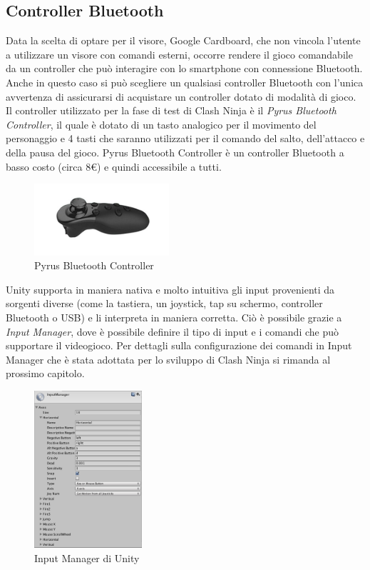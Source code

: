 \documentclass[12pt,a4paper,openright,twoside]{book}
\begin{document}
	\subsection{Controller Bluetooth}
	Data la scelta di optare per il visore, Google Cardboard, che non vincola l'utente a utilizzare un visore con comandi esterni, occorre rendere il gioco comandabile da un controller che può interagire con lo smartphone con connessione Bluetooth.\\
	Anche in questo caso si può scegliere un qualsiasi controller Bluetooth con l'unica avvertenza di assicurarsi di acquistare un controller dotato di modalità di gioco.\\
	Il controller utilizzato per la fase di test di Clash Ninja è il \textit{Pyrus Bluetooth Controller}, il quale è dotato di un tasto analogico per il movimento del personaggio e 4 tasti che saranno utilizzati per il comando del salto, dell'attacco e della pausa del gioco. Pyrus Bluetooth Controller è un controller Bluetooth a basso costo (circa 8\euro) e quindi accessibile a tutti.\\
	\begin{figure}[h]
		\centering
		\includegraphics[width=50mm]{pyruscontroller.jpg}
		\caption{Pyrus Bluetooth Controller}
		\label{fig:pyruscontroller}
	\end{figure}
	Unity supporta in maniera nativa e molto intuitiva gli input provenienti da sorgenti diverse (come la tastiera, un joystick, tap su schermo, controller Bluetooth o USB) e li interpreta in maniera corretta. Ciò è possibile grazie a \textit{Input Manager}, dove è possibile definire il tipo di input e i comandi che può supportare il videogioco. Per dettagli sulla configurazione dei comandi in Input Manager che è stata adottata per lo sviluppo di Clash Ninja si rimanda al prossimo capitolo.
	\begin{figure}[h]
		\centering
		\includegraphics[width=40mm]{inputmanager.png}
		\caption{Input Manager di Unity}
		\label{fig:inputmanager}
	\end{figure}
\newpage
\end{document}
